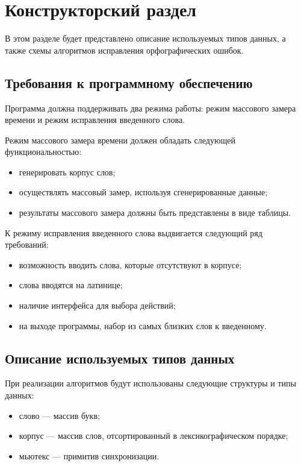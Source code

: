 \chapter{Конструкторский раздел}

В этом разделе будет представлено описание используемых типов данных, а также схемы алгоритмов исправления орфографических ошибок.

\section{Требования к программному обеспечению}

Программа должна поддерживать два режима работы: режим массового замера времени и режим исправления введенного слова.

Режим массового замера времени должен обладать следующей функциональностью:
\begin{itemize}
	\item генерировать корпус слов;
	\item осуществлять массовый замер, используя сгенерированные данные;
	\item результаты массового замера должны быть представлены в виде таблицы.
\end{itemize}

К режиму исправления введенного слова выдвигается следующий ряд требований:
\begin{itemize}
	\item возможность вводить слова, которые отсутствуют в корпусе;
	\item слова вводятся на латинице;
	\item наличие интерфейса для выбора действий;
	\item на выходе программы, набор из самых близких слов к введенному.
\end{itemize}

\section{Описание используемых типов данных}

При реализации алгоритмов будут использованы следующие структуры
и типы данных:
\begin{itemize}
	\item слово --- массив букв;
	\item корпус --- массив слов, отсортированный в лексикографическом порядке;
	\item мьютекс --- примитив синхронизации.
\end{itemize}


